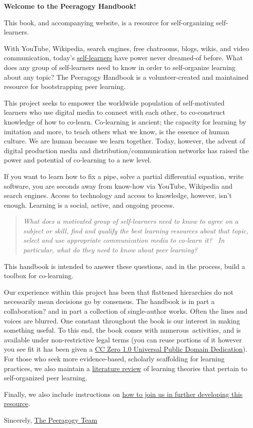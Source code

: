 \textbf{Welcome to the Peeragogy Handbook!}

This book, and accompanying website, is a resource for self-organizing
self-learners.

With YouTube, Wikipedia, search engines, free chatrooms, blogs, wikis,
and video communication, today's
\href{http://en.wikipedia.org/wiki/Self-taught\_learner}{self-learners}
have power never dreamed-of before. What does any group of self-learners
need to know in order to self-organize learning about any topic? The
Peeragogy Handbook is a volunteer-created and maintained resource for
bootstrapping peer learning.

This project seeks to empower the worldwide population of self-motivated
learners who use digital media to connect with each other, to
co-construct knowledge of how to co-learn. Co-learning is ancient; the
capacity for learning by imitation and more, to teach others what we
know, is the essence of human culture. We are human because we learn
together. Today, however, the advent of digital production media and
distribution/communication networks has raised the power and potential
of co-learning to a new level.

If you want to learn how to fix a pipe, solve a partial differential
equation, write software, you are seconds away from know-how via
YouTube, Wikipedia and search engines. Access to technology and access
to knowledge, however, isn't enough. Learning is a social, active, and
ongoing process.

\begin{quote}
\emph{What does a motivated group of self-learners need to know to agree
on a subject or skill, find and qualify the best learning resources
about that topic, select and use appropriate communication media to
co-learn it?~ In particular, what do they need to know about peer
learning?}
\end{quote}

This handbook is intended to answer these questions, and in the process,
build a toolbox for co-learning.

Our experience within this project has been that flattened hierarchies
do not necessarily mean decisions go by consensus. The handbook is in
part a collaboration? and in part a collection of single-author works.
Often the lines and voices are blurred. One constant throughout the book
is our interest in making something useful. To this end, the book comes
with numerous~activities, and is available under non-restrictive legal
terms (you can reuse portions of it however you see fit it has been
given a \href{http://creativecommons.org/publicdomain/zero/1.0/}{CC Zero
1.0 Universal Public Domain Dedication}). For those who seek more
evidence-based, scholarly scaffolding for learning practices, we also
maintain a
\href{http://peeragogy.org/resources/literature-review-peeragogy/}{literature
review} of learning theories that pertain to self-organized peer
learning.

Finally, we also include instructions on
\href{http://peeragogy.org/resources/how-to-get-involved/}{how to join
us in further developing this resource}.

Sincerely, \href{http://peeragogy.org/resources/meet-the-team/}{The
Peeragogy Team}
